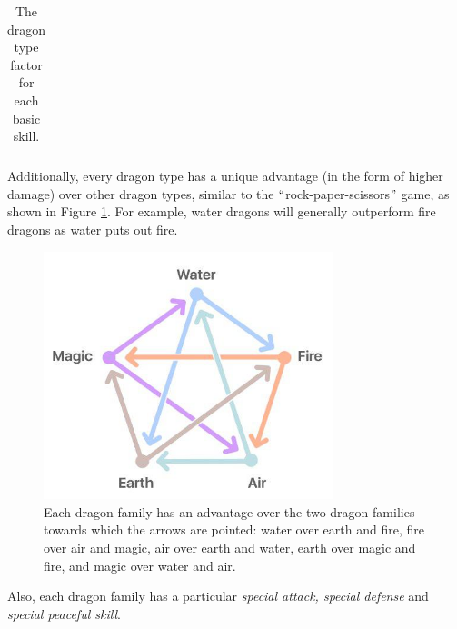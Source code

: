 \documentclass[12pt]{article}
\begin{document}
\begin{table}[!ht]
\begin{tabular}{p{0.84in}p{0.84in}p{0.84in}p{0.84in}p{0.84in}p{0.84in}}
\end{tabular}\caption{The dragon type factor for each basic skill.}
\label{tab:The dragon type factor for each basic skill.}

 \end{table}



Additionally, every dragon type has a unique advantage (in the form of higher damage) over other dragon types, similar to the $``$rock-paper-scissors$"$  game, as shown in Figure \ref{fig:Fire}. For example, water dragons will generally outperform fire dragons as water puts out fire.\par




\begin{figure}[!ht]
	\begin{Center}
		\includegraphics[width=3.32in,height=2.84in]{./media/image22.jpg}
		\caption{Each dragon family has an advantage over the two dragon families towards which the arrows are pointed: water over earth and fire, fire over air and magic, air over earth and water, earth over magic and fire, and magic over water and air.} 
		\label{fig:Fire}
	\end{Center}
\end{figure}



\par

Also, each dragon family has a particular \textit{special attack, special defense} and \textit{special peaceful skill}.\par
\end{document}
